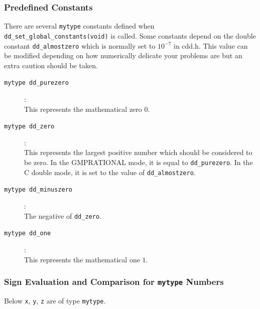 \documentclass[11pt]{article}
\newcommand {\0} {{\bf 0}}
\begin{document}
\subsubsection{Predefined  Constants} \label{constants}

There are several {\tt mytype} constants defined when {\tt dd\_set\_global\_constants(void)} is called.
Some constants depend on the double constant {\tt dd\_almostzero} which is normally set to $10^{-7}$ in cdd.h.
This value can be modified depending on how numerically delicate your problems are but an extra
caution should be taken.

\begin{description}

\item[{\tt mytype dd\_purezero}]:\\
This represents the mathematical zero $0$.

\item[{\tt mytype dd\_zero}]:\\
This represents the largest positive number which should be considered to be zero.  In the GMPRATIONAL
mode, it is equal to {\tt dd\_purezero}.   In the C double mode, it is set to the value of {\tt dd\_almostzero}.

\item[{\tt mytype dd\_minuszero}]:\\
The negative of {\tt dd\_zero}.

\item[{\tt mytype dd\_one}]:\\
This represents the mathematical one $1$.


\end{description}

\subsubsection{Sign Evaluation and Comparison for {\tt mytype} Numbers}

Below {\tt x}, {\tt y}, {\tt z} are of type {\tt mytype}.
\end{document}
